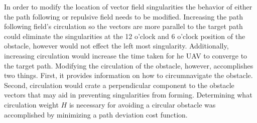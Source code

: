 \documentclass[conf]{new-aiaa}
\begin{document}
In order to modify the location of vector field singularities the behavior of either the path following or repulsive field needs to be modified. Increasing the path following field's circulation so the vectors are more parallel to the target path could eliminate the singularities at the 12 o'clock and 6 o'clock position of the obstacle, however would not effect the left most singularity. Additionally, increasing circulation would increase the time taken for he UAV to converge to the target path. Modifying the circulation of the obstacle, however, accomplishes two things. First, it provides information on how to circumnavigate the obstacle. Second, circulation would crate a perpendicular component to the obstacle vectors that may aid in preventing singularities from forming. Determining what circulation weight $H$ is necessary for avoiding a circular obstacle was accomplished by minimizing a path deviation cost function.



 




\end{document}
